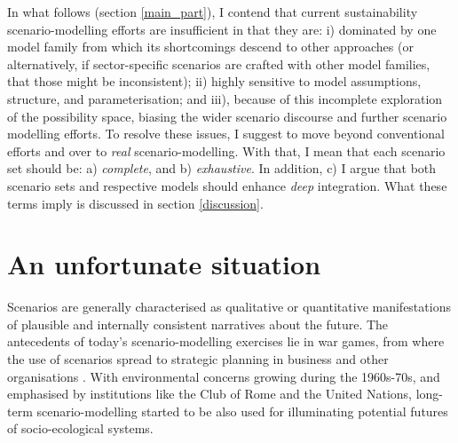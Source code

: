 \documentclass{article}
\begin{document}
\begin{refsection}

In what follows (section \ref{main_part}), I contend that current sustainability scenario-modelling efforts are insufficient in that they are: i) dominated by one model family from which its shortcomings descend to other approaches (or alternatively, if sector-specific scenarios are crafted with other model families, that those might be inconsistent); ii) highly sensitive to model assumptions, structure, and parameterisation; and iii), because of this incomplete exploration of the possibility space, biasing the wider scenario discourse and further scenario modelling efforts. To resolve these issues, I suggest to move beyond conventional efforts and over to \textit{real} scenario-modelling. With that, I mean that each scenario set should be: a) \textit{complete}, and b) \textit{exhaustive}. In addition, c) I argue that both scenario sets and respective models should enhance \textit{deep} integration. What these terms imply is discussed in section \ref{discussion}.


\label{main_part}
\section{An unfortunate situation}

Scenarios are generally characterised as qualitative or quantitative manifestations of plausible and internally consistent narratives about the future. The antecedents of today's scenario-modelling exercises lie in war games, from where the use of scenarios spread to strategic planning in business and other organisations \parencite{bradfield_2005,schoemaker_1993}.\footnotemark{} With environmental concerns growing during the 1960s-70s, and emphasised by institutions like the Club of Rome and the United Nations, long-term scenario-modelling started to be also used for illuminating potential futures of socio-ecological systems.



\end{refsection}
\end{document}

